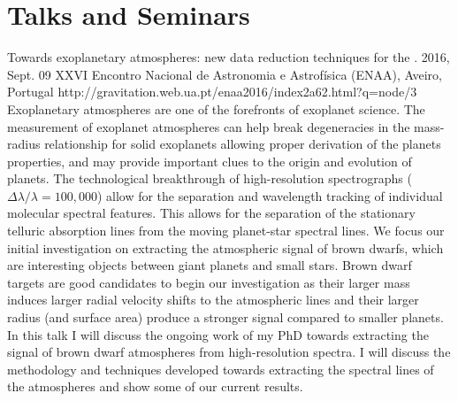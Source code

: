 \section{Talks and Seminars}\label{app_sec:talks}

{Towards exoplanetary atmospheres: new data reduction techniques for the \nir{}.} %
{2016, Sept. 09}%
{XXVI Encontro Nacional de Astronomia e Astrofísica (ENAA), Aveiro, Portugal}%
{http://gravitation.web.ua.pt/enaa2016/index2a62.html?q=node/3}%
{}%
{Exoplanetary atmospheres are one of the forefronts of exoplanet science. The measurement of exoplanet atmospheres can help break degeneracies in the mass-radius relationship for solid exoplanets allowing proper derivation of the planets properties, and may provide important clues to the origin and evolution of planets. The technological breakthrough of high-resolution spectrographs ($\Delta \lambda / \lambda = 100,000$) allow for the separation and wavelength tracking of individual molecular spectral features. This allows for the separation of the stationary telluric absorption lines from the moving planet-star spectral lines. We focus our initial investigation on extracting the atmospheric signal of brown dwarfs, which are interesting objects between giant planets and small stars. Brown dwarf targets are good candidates to begin our investigation as their larger mass induces larger radial velocity shifts to the atmospheric lines and their larger radius (and surface area) produce a stronger signal compared to smaller planets. In this talk I will discuss the ongoing work of my PhD towards extracting the signal of brown dwarf atmospheres from high-resolution \nir{}spectra. I will discuss the methodology and techniques developed towards extracting the spectral lines of the atmospheres and show some of our current results.}%


